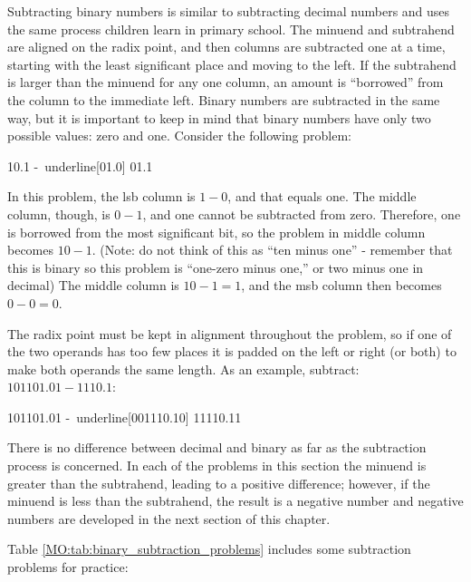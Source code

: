 Subtracting binary numbers is similar to subtracting decimal numbers and uses the same process children learn in primary school. The minuend and subtrahend are aligned on the radix point, and then columns are subtracted one at a time, starting with the least significant place and moving to the left. If the subtrahend is larger than the minuend for any one column, an amount is ``borrowed'' from the column to the immediate left. Binary numbers are subtracted in the same way, but it is important to keep in mind that binary numbers have only two possible values: zero and one. Consider the following problem: 

\begin{binDisp}[commandchars=~\[\]]
      10.1
     -~underline[01.0]
      01.1
\end{binDisp}

In this problem, the \gls{lsb} column is $ 1 - 0 $, and that equals one. The middle column, though, is $ 0 - 1 $, and one cannot be subtracted from zero. Therefore, one is borrowed from the most significant bit, so the problem in middle column becomes $ 10 - 1 $. (Note: do not think of this as ``ten minus one'' - remember that this is binary so this problem is ``one-zero minus one,'' or two minus one in decimal) The middle column is $ 10 - 1 = 1 $, and the \gls{msb} column then becomes $ 0 - 0 = 0 $. 

The radix point must be kept in alignment throughout the problem, so if one of the two operands has too few places it is padded on the left or right (or both) to make both operands the same length. As an example, subtract: $ 101101.01 - 1110.1 $: 

\begin{binDisp}[commandchars=~\[\], samepage=true]
      101101.01
     -~underline[001110.10]
       11110.11
\end{binDisp}

There is no difference between decimal and binary as far as the subtraction process is concerned. In each of the problems in this section the minuend is greater than the subtrahend, leading to a positive difference; however, if the minuend is less than the subtrahend, the result is a negative number and negative numbers are developed in the next section of this chapter. 

Table \ref{MO:tab:binary_subtraction_problems} includes some subtraction problems for practice: 

